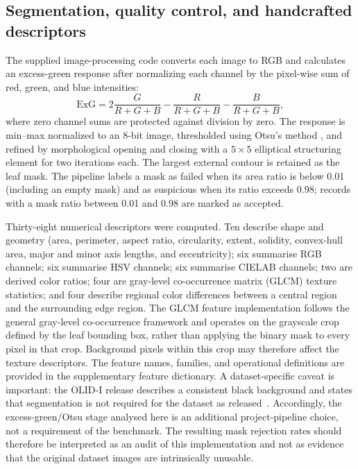 \documentclass[conference]{IEEEtran}
\begin{document}
\subsection{Segmentation, quality control, and handcrafted descriptors}

The supplied image-processing code converts each image to RGB and calculates an excess-green response after normalizing each channel by the pixel-wise sum of red, green, and blue intensities:
\begin{equation}
\mathrm{ExG}=2\frac{G}{R+G+B}-\frac{R}{R+G+B}-\frac{B}{R+G+B},
\label{eq:exg}
\end{equation}
where zero channel sums are protected against division by zero. The response is min--max normalized to an 8-bit image, thresholded using Otsu's method \cite{Otsu1979}, and refined by morphological opening and closing with a $5\times5$ elliptical structuring element for two iterations each. The largest external contour is retained as the leaf mask. The pipeline labels a mask as failed when its area ratio is below 0.01 (including an empty mask) and as suspicious when its ratio exceeds 0.98; records with a mask ratio between 0.01 and 0.98 are marked as accepted.

Thirty-eight numerical descriptors were computed. Ten describe shape and geometry (area, perimeter, aspect ratio, circularity, extent, solidity, convex-hull area, major and minor axis lengths, and eccentricity); six summarise RGB channels; six summarise HSV channels; six summarise CIELAB channels; two are derived color ratios; four are gray-level co-occurrence matrix (GLCM) texture statistics; and four describe regional color differences between a central region and the surrounding edge region. The GLCM feature implementation follows the general gray-level co-occurrence framework \cite{Haralick1973} and operates on the grayscale crop defined by the leaf bounding box, rather than applying the binary mask to every pixel in that crop. Background pixels within this crop may therefore affect the texture descriptors. The feature names, families, and operational definitions are provided in the supplementary feature dictionary. A dataset-specific caveat is important: the OLID-I release describes a consistent black background and states that segmentation is not required for the dataset as released~\cite{Orka2023}. Accordingly, the excess-green/Otsu stage analysed here is an additional project-pipeline choice, not a requirement of the benchmark. The resulting mask rejection rates should therefore be interpreted as an audit of this implementation and not as evidence that the original dataset images are intrinsically unusable.
\end{document}
